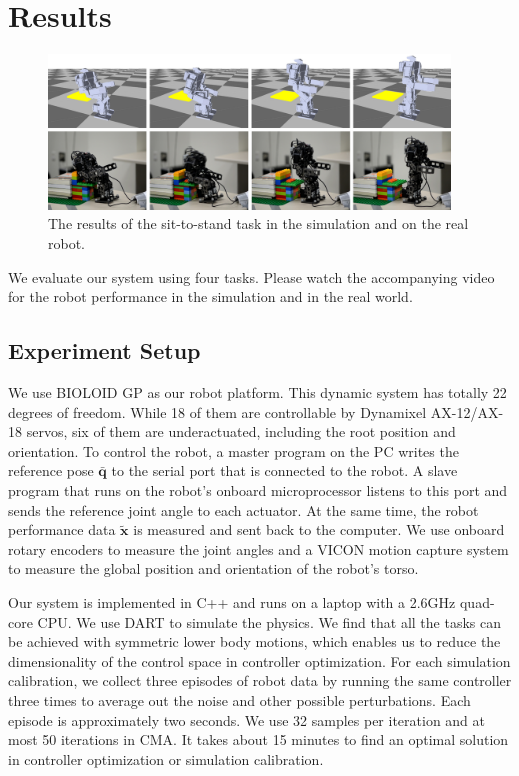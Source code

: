 \section{Results}

\begin{figure}[!t]
  \centering
  \includegraphics[width=0.95\textwidth]{figures/sit2Stand}
  \caption{The results of the sit-to-stand task in the simulation and on the real robot.}
  \vspace{-0.1in}
  \label{fig:sit2Stand}
\end{figure}

We evaluate our system using four tasks. Please watch the accompanying video for the robot performance in the simulation and in the real world.

\subsection{Experiment Setup}

We use BIOLOID GP as our robot platform. This dynamic system has totally 22 degrees of freedom. While 18 of them are controllable by Dynamixel AX-12/AX-18 servos, six of them are underactuated, including the root position and orientation. To control the robot, a master program on the PC writes the reference pose $\bar{\mathbf{q}}$ to the serial port that is connected to the robot. A slave program that runs on the robot's onboard microprocessor listens to this port and sends the reference joint angle to each actuator. At the same time, the robot performance data $\tilde{\mathbf{x}}$ is measured and sent back to the computer. We use onboard rotary encoders to measure the joint angles and a VICON motion capture system to measure the global position and orientation of the robot's torso.

Our system is implemented in C++ and runs on a laptop with a 2.6GHz quad-core CPU. We use DART to simulate the physics. We find that all the tasks can be achieved with symmetric lower body motions, which enables us to reduce the dimensionality of the control space in controller optimization. For each simulation calibration, we collect three episodes of robot data by running the same controller three times to average out the noise and other possible perturbations. Each episode is approximately two seconds. We use 32 samples per iteration and at most 50 iterations in CMA. It takes about 15 minutes to find an optimal solution in controller optimization or simulation calibration.

